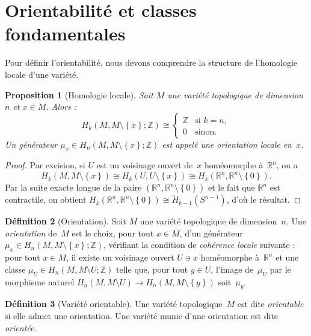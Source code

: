 \documentclass[12pt,a4paper,openany]{book}
\theoremstyle{definition}
\newtheorem{definition}{Définition}[chapter]
\theoremstyle{plain}
\newtheorem{proposition}[definition]{Proposition}
\theoremstyle{remark}
\newcommand{\Z}{\mathbb{Z}}
\newcommand{\R}{\mathbb{R}}
\newcommand{\set}[1]{\left\{#1\right\}}
\begin{document}
\section{Orientabilité et classes fondamentales}\label{sec:orientabilite}

Pour définir l'orientabilité, nous devons comprendre la structure de l'homologie
locale d'une variété.

\begin{proposition}[Homologie locale]\label{prop:homologie-locale}
  Soit $M$ une variété topologique de dimension~$n$ et $x \in M$. Alors :
  \[
    H_k(M, M \setminus \set{x}; \Z) \cong
    \begin{cases}
      \Z & \text{si } k = n, \\
      0  & \text{sinon.}
    \end{cases}
  \]
  Un générateur $\mu_x \in H_n(M, M \setminus \set{x}; \Z)$ est appelé une
  \emph{orientation locale} en~$x$.
\end{proposition}

\begin{proof}
  Par excision, si $U$ est un voisinage ouvert de~$x$ homéomorphe à~$\R^n$, on a
  \[
    H_k(M, M \setminus \set{x}) \cong H_k(U, U \setminus \set{x})
    \cong H_k(\R^n, \R^n \setminus \set{0}).
  \]
  Par la suite exacte longue de la paire $(\R^n, \R^n \setminus \set{0})$ et le fait
  que $\R^n$ est contractile, on obtient
  $H_k(\R^n, \R^n \setminus \set{0}) \cong \widetilde{H}_{k-1}(S^{n-1})$,
  d'où le résultat.
\end{proof}

\begin{definition}[Orientation]\label{def:orientation}
  Soit $M$ une variété topologique de dimension~$n$. Une \emph{orientation} de~$M$
  est le choix, pour tout $x \in M$, d'un générateur
  $\mu_x \in H_n(M, M \setminus \set{x}; \Z)$,
  vérifiant la condition de \emph{cohérence locale} suivante : pour tout $x \in M$,
  il existe un voisinage ouvert $U \ni x$ homéomorphe à~$\R^n$ et une classe
  $\mu_U \in H_n(M, M \setminus U; \Z)$
  telle que, pour tout $y \in U$, l'image de~$\mu_U$ par le morphisme naturel
  $H_n(M, M \setminus U) \to H_n(M, M \setminus \set{y})$
  soit~$\mu_y$.
\end{definition}

\begin{definition}[Variété orientable]\label{def:variete-orientable}
  Une variété topologique~$M$ est dite \emph{orientable} si elle admet une orientation.
  Une variété munie d'une orientation est dite \emph{orientée}.
\end{definition}
\end{document}

